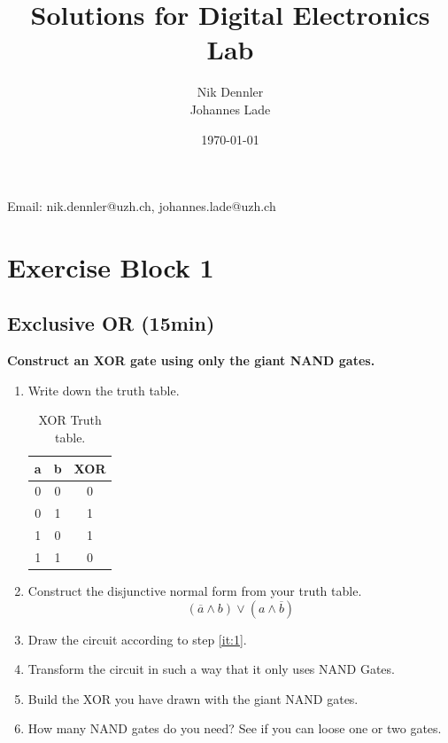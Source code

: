 \documentclass[10pt,a4paper]{article}
\author{Nik Dennler \\ Johannes Lade}
\title{Solutions for Digital Electronics Lab}
\date{\today{}}
\begin{document}
	
\begin{titlepage}
	\maketitle
		\begin{center}
			Email: nik.dennler@uzh.ch, johannes.lade@uzh.ch
		\end{center}
	\thispagestyle{empty}
\end{titlepage}




\tableofcontents
\newpage

\newpage
\section{Exercise Block 1}
\label{sec:exercise-block-1}

\subsection{Exclusive OR (15min)}\label{subsec:ex-1}
\textbf{Construct an XOR gate using only the giant NAND gates.}

\begin{enumerate}
	\item Write down the truth table.
	\begin{table}[H]
		\centering
		\begin{tabular}{|c|c|c|}
			\hline
			a & b & XOR \\ \hline
			0 & 0 & 0   \\ \hline
			0 & 1 & 1   \\ \hline
			1 & 0 & 1   \\ \hline
			1 & 1 & 0   \\ \hline
		\end{tabular}
		\caption{XOR Truth table.}
		\label{tab:xor-truht-table}
	\end{table}
	\item\label{it:1} Construct the disjunctive normal form from your truth table.
	\[
		(\overline{a} \land b) \lor (a \land \overline{b})
	\]
	\item Draw the circuit according to step \ref{it:1}.
	
	\item Transform the circuit in such a way that it only uses NAND Gates.
	\item Build the XOR you have drawn with the giant NAND gates.
	\item How many NAND gates do you need? See if you can loose one or two gates.
\end{enumerate}
\end{document}
